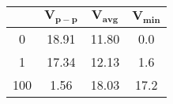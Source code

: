 \begin{tabular}{|c|c|c|c|}
	\hline
	\tbf{Capacitor (\si{\micro\farad}} &
		$\mathbf{V_{p-p}}$ \tbf{(\si{\volt})}&
			$\mathbf{V_{avg}}$ \tbf{(\si{\volt})}&
				$\mathbf{V_{min}}$ \tbf{(\si{\volt})} \\ \hline

	0         & 18.91	& 11.80 	& 0.0  \\ \hline
	1         & 17.34   & 12.13		& 1.6  \\ \hline
    100       & 1.56	& 18.03     & 17.2 \\ \hline
\end{tabular}
